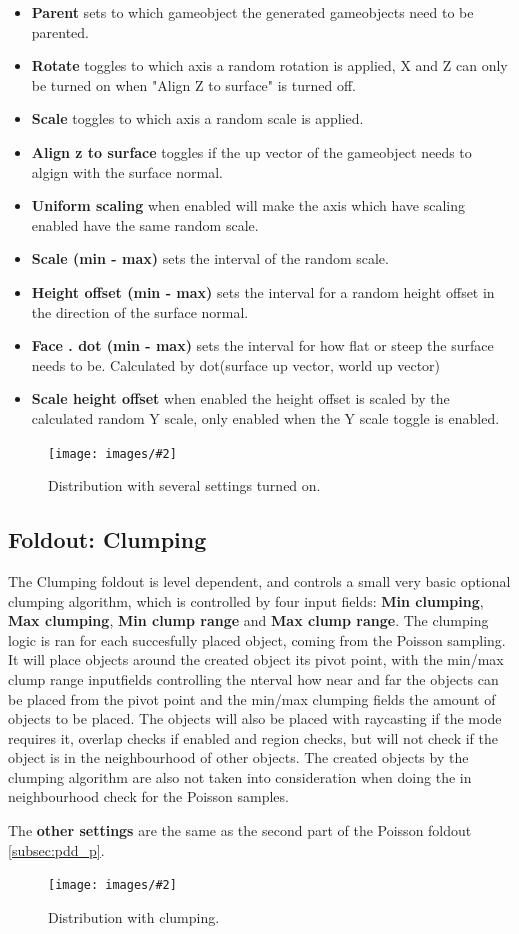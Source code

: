 \documentclass{paper}
\newlength{\imgwidth} %
\newcommand\scalegraphics[3][]
{
	\begin{figure}[H]
	\centering
	\settowidth{\imgwidth}{\texttt{[image: images/\#2]}} %
	\setlength{\imgwidth}{\minof{#1\imgwidth}{\textwidth}} %
	\texttt{[image: images/\#2]} %
	\caption{#3}
	\end{figure}
}
\newcommand*\bracket[1]{\lbrack#1\rbrack} %
\begin{document}
\begin{itemize}
\item \textbf{Parent} sets to which gameobject the generated gameobjects need to be parented.
\item \textbf{Rotate} toggles to which axis a random rotation is applied, X and Z can only be turned on when "Align Z to surface" is turned off.
\item \textbf{Scale} toggles to which axis a random scale is applied.
\item \textbf{Align z to surface} toggles if the up vector of the gameobject needs to algign with the surface normal.
\item \textbf{Uniform scaling} when enabled will make the axis which have scaling enabled have the same random scale.
\item \textbf{Scale (min - max)} sets the interval of the random scale.
\item \textbf{Height offset (min - max)} sets the interval for a random height offset in the direction of the surface normal.
\item \textbf{Face . dot (min - max)} sets the interval for how flat or steep the surface needs to be. Calculated by dot(surface up vector, world up vector)
\item \textbf{Scale height offset} when enabled the height offset is scaled by the calculated random Y scale, only enabled when the Y scale toggle is enabled.
\end{itemize}
\scalegraphics[0.6]{Poisson_Sub.png}{Distribution with several settings turned on.}

\newpage
\subsection{Foldout: Clumping}\label{subsec:pdd_c}
The Clumping foldout is level dependent, and controls a small very basic optional clumping algorithm, which is controlled by four input fields: \textbf{Min clumping}, \textbf{Max clumping}, \textbf{Min clump range} and \textbf{Max clump range}. The clumping logic is ran for each succesfully placed object, coming from the Poisson sampling. It will place objects around the created object its pivot point, with the min/max clump range inputfields controlling the nterval how near and far the objects can be placed from the pivot point and the min/max clumping fields the amount of objects to be placed. The objects will also be placed with raycasting if the mode requires it, overlap checks if enabled and region checks, but will not check if the object is in the neighbourhood of other objects. The created objects by the clumping algorithm are also not taken into consideration when doing the in neighbourhood check for the Poisson samples.
\par
The  \textbf{other settings} are the same as the second part of the Poisson foldout \bracket{\ref{subsec:pdd_p}}.
\scalegraphics[0.6]{Clumping.png}{Distribution with clumping.}
\end{document}
